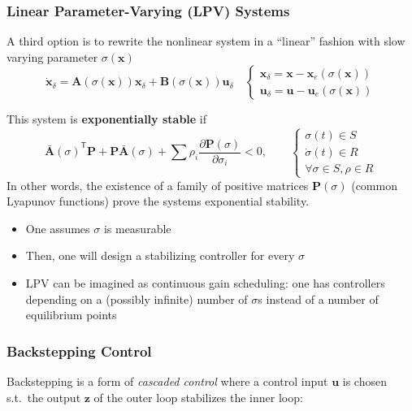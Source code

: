 \subsubsection{Linear Parameter-Varying (LPV) Systems}
A third option is to rewrite the nonlinear system in a ``linear'' fashion with slow varying parameter $\sigma(\mathbf{x})$
\noindent\begin{equation*}
    \dot{\mathbf{x}}_\delta = \mathbf{A} (\sigma(\mathbf{x}))\mathbf{x}_\delta + \mathbf{B}(\sigma(\mathbf{x}))\mathbf{u}_\delta\quad
    \begin{cases}
        \mathbf{x}_\delta = \mathbf{x}-\mathbf{x}_e(\sigma(\mathbf{x})) \\
        \mathbf{u}_\delta = \mathbf{u}-\mathbf{u}_e(\sigma(\mathbf{x}))
    \end{cases}
\end{equation*}

\newpar{}

This system is \textbf{exponentially stable} if
\noindent\begin{equation*}
    {\bar{\mathbf{A}}(\sigma)}^{\mathsf{T}} \mathbf{P} + \mathbf{P}\bar{\mathbf{A}}(\sigma) + \sum \rho_i \frac{\partial \mathbf{P}(\sigma)}{\partial \sigma_i} < 0,\qquad
    \begin{cases}
        \sigma(t)\in S       \\
        \dot{\sigma}(t)\in R \\
        \forall \sigma\in S, \rho\in R
    \end{cases}
\end{equation*}
In other words, the existence of a family of positive matrices $\mathbf{P}(\sigma)$ (common Lyapunov functions) prove the systems exponential stability.

\newpar{}

\begin{itemize}
    \item One assumes $\sigma$ is measurable
    \item Then, one will design a stabilizing controller for every $\sigma$
    \item LPV can be imagined as continuous gain scheduling: one has controllers depending on a (possibly infinite) number of $\sigma$s instead of a number of equilibrium points
\end{itemize}

\subsubsection{Backstepping Control}
Backstepping is a form of \textit{cascaded control} where a control input $\mathbf{u}$ is chosen s.t.\ the output $\mathbf{z}$ of the outer loop stabilizes the inner loop:


